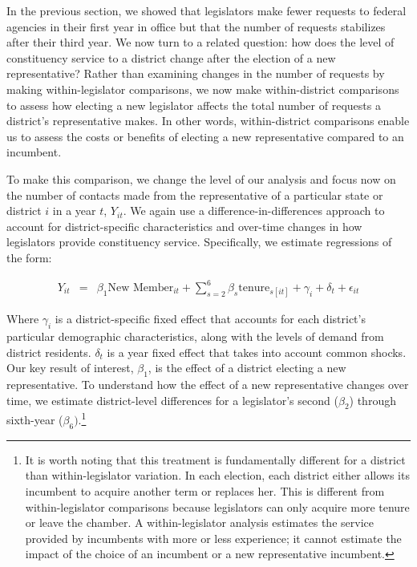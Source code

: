 \documentclass[12pt]{article}
\begin{document}
In the previous section, we showed that legislators make fewer requests to federal agencies in their first year in office but that the number of requests stabilizes after their third year. We now turn to a related question: how does the level of constituency service to a district change after the election of a new representative? Rather than examining changes in the number of requests by making within-legislator comparisons, we now make within-district comparisons to assess how electing a new legislator affects the total number of requests a district's representative makes. In other words, within-district comparisons enable us to assess the costs or benefits of electing a new representative compared to an incumbent.


To make this comparison, we change the level of our analysis and focus now on the number of contacts made from the representative of a particular state or district $i$ in a year $t$, $Y_{it}$. We again use a difference-in-differences approach to account for district-specific characteristics and over-time changes in how legislators provide constituency service. Specifically, we estimate regressions of the form: 


\begin{eqnarray}
Y_{it} & = & \beta_{1}\text{New Member}_{it} + \sum_{s = 2}^{6} \beta_{s} \text{tenure}_{s[it]} + \gamma_{i} + \delta_{t} + \epsilon_{it} \label{e:district1} 
\end{eqnarray}

Where $\gamma_{i}$ is a district-specific fixed effect that accounts for each district's particular demographic characteristics, along with the levels of demand from district residents. $\delta_{t}$ is a year fixed effect that takes into account common shocks. Our key result of interest, $\beta_{1}$, is the effect of a district electing a new representative. To understand how the effect of a new representative changes over time, we estimate district-level differences for a legislator's second ($\beta_{2}$) through sixth-year ($\beta_{6})$.\footnote{It is worth noting that this treatment is fundamentally different for a district than within-legislator variation. In each election, each district either allows its incumbent to acquire another term or replaces her. This is different from within-legislator comparisons because legislators can only acquire more tenure or leave the chamber. A within-legislator analysis estimates the service provided by incumbents with more or less experience; it cannot estimate the impact of the choice of an incumbent or a new representative incumbent.} %
\end{document}
